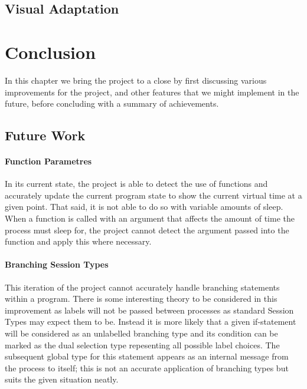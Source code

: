 \documentclass[11pt, abstracton, twoside]{scrartcl}
\begin{document}
\subsection{Visual Adaptation}


\newpage

\section{Conclusion}
\thispagestyle{empty}
In this chapter we bring the project to a close by first discussing various 
improvements for the project, and other features that we might implement 
in the future, before concluding with a summary of achievements. 

\subsection{Future Work}
\paragraph{Function Parametres}
In its current state, the project is able to detect the use of functions
and accurately update the current program state to show the current virtual
time at a given point. That said, it is not able to do so with variable
amounts of sleep. When a function is called with an argument that affects the
amount of time the process must sleep for, the project cannot detect the
argument passed into the function and apply this where necessary.

\paragraph{Branching Session Types}
This iteration of the project cannot accurately handle branching statements 
within a program. There is some interesting theory to be considered in this
improvement as labels will not be passed between processes as standard Session
Types may expect them to be. Instead it is more likely that a given if-statement
will be considered as an unlabelled branching type and its condition
can be marked as the dual selection type repesenting all possible label choices.
The subsequent global type for this statement appears as an internal message
from the process to itself; this is not an accurate application of branching
types but suits the given situation neatly.
\end{document}
